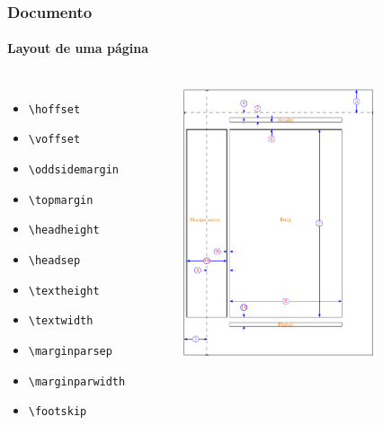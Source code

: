\begin{frame}[fragile]
\frametitle{Documento}
\framesubtitle{Layout de uma página}
  \scriptsize
  \begin{columns}[c]
  \begin{itemize}
  \item \verb|\hoffset|
  \item \verb|\voffset|
  \item \verb|\oddsidemargin|
  \item \verb|\topmargin|
  \item \verb|\headheight|
  \item \verb|\headsep|
  \item \verb|\textheight| 
  \item \verb|\textwidth|
  \item \verb|\marginparsep|
  \item \verb|\marginparwidth|
  \item \verb|\footskip|
  \end{itemize}
  \vspace{-1.5cm}
\begin{figure}[h!]
  \centering
  \label{fig:Latex_layout}
    \includegraphics[width=0.8\textwidth,height=.95\textheight,keepaspectratio]{figures/Latex_layout.pdf}
\end{figure}
  \end{columns}
\end{frame}


